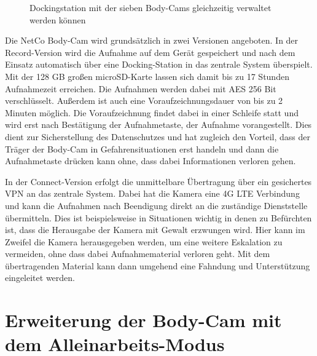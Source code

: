 \documentclass[thesis.tex]{subfiles}
\begin{document}
\begin{figure}[h]
    \centering
    \qquad
    \caption{Dockingstation mit der sieben Body-Cams gleichzeitig verwaltet werden können}
    \label{fig:BC_docking_7}
\end{figure}

Die NetCo Body-Cam wird grundsätzlich in zwei Versionen angeboten.
In der Record-Version wird die Aufnahme auf dem Gerät gespeichert und nach dem Einsatz automatisch über eine Docking-Station in das zentrale System überspielt.
Mit der 128 GB großen microSD-Karte lassen sich damit bis zu 17 Stunden Aufnahmezeit erreichen.
Die Aufnahmen werden dabei mit AES 256 Bit verschlüsselt.
Außerdem ist auch eine Voraufzeichnungsdauer von bis zu 2 Minuten möglich.
Die Voraufzeichnung findet dabei in einer Schleife statt und wird erst nach Bestätigung der Aufnahmetaste, der Aufnahme vorangestellt.
Dies dient zur Sicherstellung des Datenschutzes und hat zugleich den Vorteil, dass der Träger der Body-Cam in Gefahrensituationen erst handeln und dann die Aufnahmetaste drücken kann ohne, dass dabei Informationen verloren gehen.

In der Connect-Version erfolgt die unmittelbare Übertragung über ein gesichertes VPN an das zentrale System.
Dabei hat die Kamera eine 4G LTE Verbindung und kann die Aufnahmen nach Beendigung direkt an die zuständige Dienststelle übermitteln.
Dies ist beispielsweise in Situationen wichtig in denen zu Befürchten ist, dass die Herausgabe der Kamera mit Gewalt erzwungen wird.
Hier kann im Zweifel die Kamera herausgegeben werden, um eine weitere Eskalation zu vermeiden, ohne dass dabei Aufnahmematerial verloren geht.
Mit dem übertragenden Material kann dann umgehend eine Fahndung und Unterstützung eingeleitet werden.

\section{Erweiterung der Body-Cam mit dem Alleinarbeits-Modus}
\end{document}
